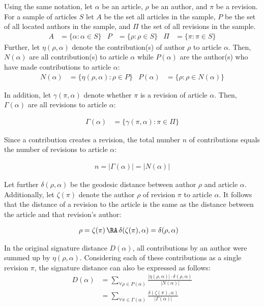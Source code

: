 Using the same notation, let $\alpha$ be an article, $\rho$ be an author, and $\pi$ be a revision.
For a sample of articles $S$ let $A$ be the set all articles in the sample, $P$ be the set of all located authors in the sample, and $\Pi$ the set of all revisions in the sample.
\begin{align*}
A &= \{\alpha : \alpha \in S\} &P &= \{\rho : \rho \in S\} & \Pi &= \{\pi : \pi \in S\}
\end{align*}
Further, let $\eta(\rho,\alpha)$ denote the contribution(s) of author $\rho$ to article $\alpha$.
Then, $N(\alpha)$ are all contribution(s) to article $\alpha$ while $P(\alpha)$ are the author(s) who have made contributions to article $\alpha$:
\begin{align*}
N(\alpha) &= \{\eta(\rho,\alpha) : \rho \in P\} & P(\alpha) &= \{\rho : \rho \in N(\alpha)\}
\end{align*}

In addition, let $\gamma(\pi,\alpha)$ denote whether $\pi$ is a revision of article $\alpha$.
Then, $\Gamma(\alpha)$ are all revisions to article $\alpha$:

\begin{align*}
\Gamma(\alpha) &= \{\gamma(\pi,\alpha) : \pi \in \Pi\}
\end{align*}

Since a contribution creates a revision, the total number $n$ of contributions equals the number of revisions to article $\alpha$:

\begin{align*}
 n = |\Gamma(\alpha)| = |N(\alpha)|
\end{align*}

Let further $\delta(\rho,\alpha)$ be the geodesic distance between author $\rho$ and article $\alpha$.
Additionally, let $\zeta(\pi)$ denote  the author $\rho$ of revision $\pi$ to article $\alpha$.
It follows that the distance of a revision to the article is the same as the distance between the article and that revision's author:

\begin{align*}
\rho &= \zeta(\pi) \, \RA \,   \delta(\zeta(\pi),\alpha) = \delta(\rho,\alpha) 
\end{align*}

In the original signature distance $D(\alpha)$, all contributions by an author were summed up by $\eta(\rho,\alpha)$.
Considering each of these contributions as a single revision $\pi$, the signature distance can also be  expressed as follows:
\begin{align*}
D(\alpha) &= \sum_{\forall \rho \in P(\alpha)} \frac{|\eta(\rho,\alpha)| \cdot \delta(\rho,\alpha)}{|N(\alpha)|} \\
 &=  \sum_{\forall \pi \in \Gamma(\alpha)} \frac{\delta(\zeta(\pi),\alpha)}{|\Gamma(\alpha)|}
 \end{align*}

